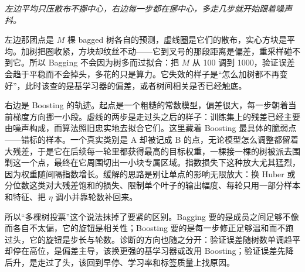 \emph{左边平均只压散布不挪中心，右边每一步都在挪中心，多走几步就开始跟着噪声抖。}

左边那团点是 \(M\) 棵 bagged 树各自的预测，虚线圈是它们的散布，实心方块是平均。加树把圈收紧，方块却纹丝不动——它到叉号的那段距离是偏差，重采样碰不到它。所以 Bagging 不会因为树多而过拟合：把 \(M\) 从 100 调到 1000，验证误差会趋于平稳而不会掉头，多花的只是算力。它失效的样子是``怎么加树都不再变好''，此时该查的是基学习器的偏差，或者树间相关是否已经触底。

右边是 Boosting 的轨迹。起点是一个粗糙的常数模型，偏差很大，每一步朝着当前梯度方向挪一小段。虚线的两步是走过头之后的样子：训练集上的残差已经主要由噪声构成，而算法照旧忠实地去拟合它们。这里藏着 Boosting 最具体的脆弱点——错标的样本。一个真实类别是 A 却被记成 B 的点，无论模型怎么调整都留着大残差，于是它在后续每一轮里都获得最高的目标权重，一棵接一棵的树被派去围剿这一个点，最终在它周围切出一小块专属区域。指数损失下这种放大尤其猛烈，因为权重随间隔指数增长。缓解的思路是别让单点的影响无限放大：换 Huber 或分位数这类对大残差饱和的损失、限制单个叶子的输出幅度、每轮只用一部分样本和特征、把 \(\eta\) 调小并靠轮数补回来。

所以``多棵树投票''这个说法抹掉了要紧的区别。Bagging 要的是成员之间足够不像而各自不太偏，它的旋钮是相关性；Boosting 要的是每一步修正足够温和而不跑过头，它的旋钮是步长与轮数。诊断的方向也随之分开：验证误差随树数单调趋平却停在高位，是偏差主导，该换更强的基学习器或改用 Boosting；验证误差先降后升，是走过了头，该回到早停、学习率和标签质量上找原因。

